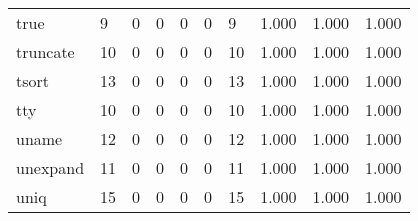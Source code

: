 \begin{longtable}{lp{2.0cm}p{2.0cm}p{2.0cm}p{2.0cm}p{2.0cm}p{2.0cm}p{2.0cm}p{2.0cm}p{2.0cm}}
true      &                      9 &                                             0 &                                            0 &                                           0 &                                            0 &                                          9 &                                1.000 &                                  1.000 &                                1.000 \\
truncate  &                     10 &                                             0 &                                            0 &                                           0 &                                            0 &                                         10 &                                1.000 &                                  1.000 &                                1.000 \\
tsort     &                     13 &                                             0 &                                            0 &                                           0 &                                            0 &                                         13 &                                1.000 &                                  1.000 &                                1.000 \\
tty       &                     10 &                                             0 &                                            0 &                                           0 &                                            0 &                                         10 &                                1.000 &                                  1.000 &                                1.000 \\
uname     &                     12 &                                             0 &                                            0 &                                           0 &                                            0 &                                         12 &                                1.000 &                                  1.000 &                                1.000 \\
unexpand  &                     11 &                                             0 &                                            0 &                                           0 &                                            0 &                                         11 &                                1.000 &                                  1.000 &                                1.000 \\
uniq      &                     15 &                                             0 &                                            0 &                                           0 &                                            0 &                                         15 &                                1.000 &                                  1.000 &                                1.000 \\

\end{longtable}

